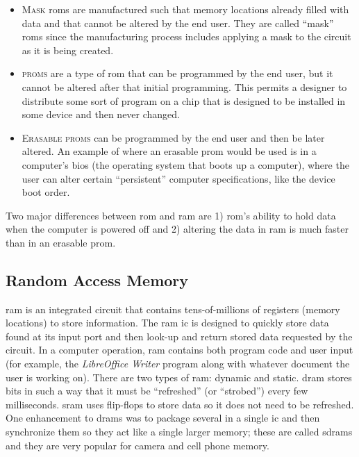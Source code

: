 \begin{itemize}
  \item \textsc{Mask} \glspl{rom} are manufactured such that memory locations already filled with data and that cannot be altered by the end user. They are called ``mask'' \glspl{rom} since the manufacturing process includes applying a mask to the circuit as it is being created. 
  \item \textsc{\glspl{prom}} are a type of \gls{rom} that can be programmed by the end user, but it cannot be altered after that initial programming. This permits a designer to distribute some sort of program on a chip that is designed to be installed in some device and then never changed.
  \item \textsc{Erasable \glspl{prom}} can be programmed by the end user and then be later altered. An example of where an erasable \gls{prom} would be used is in a computer's \gls{bios} (the operating system that boots up a computer), where the user can alter certain ``persistent'' computer specifications, like the device boot order. 
\end{itemize}

Two major differences between \gls{rom} and \gls{ram} are 1) \gls{rom}'s ability to hold data when the computer is powered off and 2) altering the data in \gls{ram} is much faster than in an erasable \gls{prom}.

\subsection{Random Access Memory}
\label{SL:subsec:random_access_memory}

\gls{ram} is an integrated circuit that contains tens-of-millions of registers (memory locations) to store information. The \gls{ram} \gls{ic} is designed to quickly store data found at its input port and then look-up and return stored data requested by the circuit. In a computer operation, \gls{ram} contains both program code and user input (for example, the \emph{LibreOffice Writer} program along with whatever document the user is working on). There are two types of \gls{ram}: dynamic and static. \gls{dram} stores bits in such a way that it must be ``refreshed'' (or ``strobed'') every few milliseconds. \gls{sram} uses flip-flops to store data so it does not need to be refreshed. One enhancement to \glspl{dram} was to package several in a single \gls{ic} and then synchronize them so they act like a single larger memory; these are called \glspl{sdram} and they are very popular for camera and cell phone memory.

